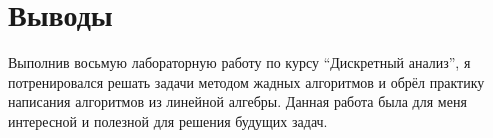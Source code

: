 \section{Выводы}
Выполнив восьмую лабораторную работу по курсу \enquote{Дискретный анализ}, я потренировался решать задачи методом жадных алгоритмов и обрёл практику написания алгоритмов из линейной алгебры. Данная работа была для меня интересной и полезной для решения будущих задач.
\pagebreak
